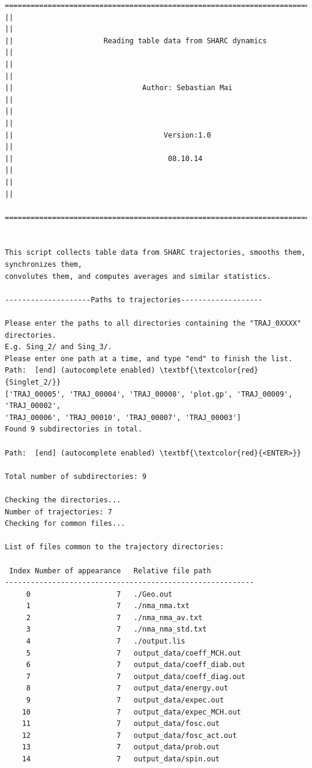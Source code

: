 \documentclass[a4paper,11pt,DIV=15,openany]{scrbook}
\begin{document}
\begin{oframed}
\footnotesize\begin{Verbatim}[commandchars=\\\{\}]
  ================================================================================
||                                                                                ||
||                     Reading table data from SHARC dynamics                     ||
||                                                                                ||
||                              Author: Sebastian Mai                             ||
||                                                                                ||
||                                   Version:1.0                                  ||
||                                    08.10.14                                    ||
||                                                                                ||
  ================================================================================


This script collects table data from SHARC trajectories, smooths them, synchronizes them,
convolutes them, and computes averages and similar statistics.
  
--------------------Paths to trajectories-------------------

Please enter the paths to all directories containing the "TRAJ_0XXXX" directories.
E.g. Sing_2/ and Sing_3/. 
Please enter one path at a time, and type "end" to finish the list.
Path:  [end] (autocomplete enabled) \textbf{\textcolor{red}{Singlet_2/}}
['TRAJ_00005', 'TRAJ_00004', 'TRAJ_00008', 'plot.gp', 'TRAJ_00009', 'TRAJ_00002',
'TRAJ_00006', 'TRAJ_00010', 'TRAJ_00007', 'TRAJ_00003']
Found 9 subdirectories in total.

Path:  [end] (autocomplete enabled) \textbf{\textcolor{red}{<ENTER>}}

Total number of subdirectories: 9

Checking the directories...
Number of trajectories: 7
Checking for common files...

List of files common to the trajectory directories:

 Index Number of appearance   Relative file path
----------------------------------------------------------
     0                    7   ./Geo.out
     1                    7   ./nma_nma.txt
     2                    7   ./nma_nma_av.txt
     3                    7   ./nma_nma_std.txt
     4                    7   ./output.lis
     5                    7   output_data/coeff_MCH.out
     6                    7   output_data/coeff_diab.out
     7                    7   output_data/coeff_diag.out
     8                    7   output_data/energy.out
     9                    7   output_data/expec.out
    10                    7   output_data/expec_MCH.out
    11                    7   output_data/fosc.out
    12                    7   output_data/fosc_act.out
    13                    7   output_data/prob.out
    14                    7   output_data/spin.out


\end{Verbatim}
\end{oframed}
\end{document}
